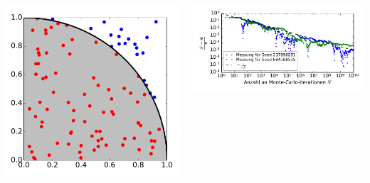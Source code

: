 \begin{frame}
\begin{columns}
\begin{column}{0.35\linewidth}
        \centerline{\includegraphics[width=1.1\linewidth]{monte-carlo-pi-quarter-sphere.pdf}}
    \end{column}\begin{column}{0.65\linewidth}
        \centerline{\includegraphics[width=1.1\linewidth]{monte-carlo-pi-error-scaling.pdf}}

\end{column}
\end{columns}
\end{frame}
